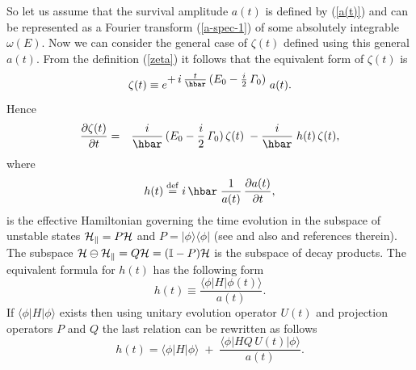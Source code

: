 \documentclass[12pt]{article}
\begin{document}
So let us assume that the survival amplitude $a(t)$ is defined by (\ref{a(t)}) and can be represented as a Fourier transform (\ref{a-spec-1}) of some absolutely integrable $\omega (E)$. Now we can consider
the general case of $\zeta (t)$ defined using this general $a(t)$.
From the definition (\ref{zeta}) it follows that the equivalent form of $\zeta (t)$ is
\begin{equation}
\zeta (t) \equiv e^{\textstyle{+\,i\,\frac{t}{\hbar}\,(E_{0} - \frac{i}{2}\,{\it\Gamma}_{0})}}\;a(t). \label{zeta-1}
\end{equation}
Hence
\begin{eqnarray}
\frac{\partial \zeta (t)}{\partial t}
 &=& \frac{i}{\hbar}\, (E_{0} - \frac{i}{2}\,{\it\Gamma}_{0})\,\zeta (t) \;-\frac{i}{\hbar}\; h(t)\,\zeta (t), \label{d-zeta}
\end{eqnarray}
where
\begin{equation}
h(t) \stackrel{\rm def}{=} i\,\hbar\;\frac{1}{a(t)}\,\frac{\partial a(t)}{\partial t},\label{h(t)}
\end{equation}
is the effective Hamiltonian governing the time evolution in the subspace of unstable states ${\cal H}_{\parallel} = P {\cal H}$ and $P = |\phi\rangle \langle \phi|$
(see \cite{pra}  and also \cite{ku-2008,ku-2009} and references therein).
The subspace ${\cal H} \ominus {\cal H}_{\parallel} = Q {\cal H} = (\mathbb{I} - P) {\cal H}$ is the subspace of decay products.
The equivalent formula for $h(t)$ has the following form
\begin{equation}
h(t) \equiv \frac{\langle \phi|H|\phi (t) \rangle}{a(t)}. \label{h(t)-eq}
\end{equation}
If $\langle \phi |H| \phi\rangle $ exists then  using unitary evolution operator $U(t)$ and projection operators $P$ and $Q$ the last relation can be rewritten as follows
\begin{equation}
h(t) = \langle \phi|H|\phi \rangle  \;+\; \frac{\langle \phi|HQ\,U(t) |\phi \rangle}{a(t)}. \label{h(t)-1}
\end{equation}
\end{document}
